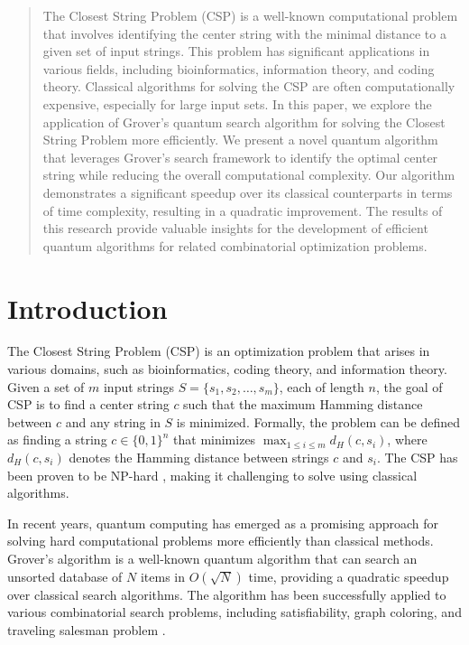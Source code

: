 \begin{abstract}
The Closest String Problem (CSP) is a well-known computational problem that involves identifying the center string with the minimal distance to a given set of input strings. This problem has significant applications in various fields, including bioinformatics, information theory, and coding theory. Classical algorithms for solving the CSP are often computationally expensive, especially for large input sets. In this paper, we explore the application of Grover's quantum search algorithm for solving the Closest String Problem more efficiently. We present a novel quantum algorithm that leverages Grover's search framework to identify the optimal center string while reducing the overall computational complexity. Our algorithm demonstrates a significant speedup over its classical counterparts in terms of time complexity, resulting in a quadratic improvement. The results of this research provide valuable insights for the development of efficient quantum algorithms for related combinatorial optimization problems.
\end{abstract}

\section{Introduction}

The Closest String Problem (CSP) is an optimization problem that arises in various domains, such as bioinformatics, coding theory, and information theory. Given a set of $m$ input strings $S = \{s_1, s_2, \ldots, s_m\}$, each of length $n$, the goal of CSP is to find a center string $c$ such that the maximum Hamming distance between $c$ and any string in $S$ is minimized. Formally, the problem can be defined as finding a string $c \in \{0, 1\}^n$ that minimizes $\max_{1 \leq i \leq m} d_H(c, s_i)$, where $d_H(c, s_i)$ denotes the Hamming distance between strings $c$ and $s_i$. The CSP has been proven to be NP-hard \cite{lanctot2003closest}, making it challenging to solve using classical algorithms.

In recent years, quantum computing has emerged as a promising approach for solving hard computational problems more efficiently than classical methods. Grover's algorithm \cite{grover1996fast} is a well-known quantum algorithm that can search an unsorted database of $N$ items in $O(\sqrt{N})$ time, providing a quadratic speedup over classical search algorithms. The algorithm has been successfully applied to various combinatorial search problems, including satisfiability, graph coloring, and traveling salesman problem \cite{roland2002quantum,childs2002quantum,ambainis2006quantum}.

